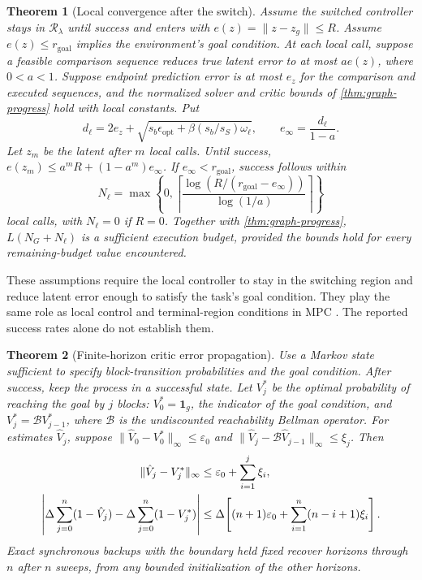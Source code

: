\documentclass{article} %
\newcommand{\ind}{\mathbf{1}}
\newcommand{\Rset}{\mathcal R_\lambda}
\newtheorem{theorem}{Theorem}
\theoremstyle{definition}
\theoremstyle{remark}
\begin{document}
\begin{theorem}[Local convergence after the switch]
\label{thm:local}
Assume the switched controller stays in $\Rset$ until success and enters with
$e(z)=\|z-z_g\|\le R$. Assume $e(z)\le r_{\mathrm{goal}}$ implies the environment's
goal condition. At each local call, suppose a feasible comparison sequence reduces true
latent error to at most $a e(z)$, where $0<a<1$.
Suppose endpoint prediction error is at most $e_z$ for the comparison and executed
sequences, and the normalized solver and critic bounds of \cref{thm:graph-progress}
hold with local constants. Put
\begin{equation}
 d_\ell=2e_z+
 \sqrt{s_b\epsilon_{\mathrm{opt}}+\beta(s_b/s_S)\omega_\ell},
 \qquad e_\infty=\frac{d_\ell}{1-a}.
 \label{eq:local-floor}
\end{equation}
Let $z_m$ be the latent after $m$ local calls. Until success, $e(z_m)\le a^mR+(1-a^m)e_\infty$.
If $e_\infty<r_{\mathrm{goal}}$, success follows within
\[
 N_\ell=\max\!\left\{0,\left\lceil
 \frac{\log(R/(r_{\mathrm{goal}}-e_\infty))}{\log(1/a)}
 \right\rceil\right\}
\]
local calls, with $N_\ell=0$ if $R=0$.
Together with \cref{thm:graph-progress}, $L(N_G+N_\ell)$ is a sufficient execution budget,
provided the bounds hold for every remaining-budget value encountered.
\end{theorem}

These assumptions require the local controller to stay in the switching region and
reduce latent error enough to satisfy the task's goal condition. They play the same role
as local control and terminal-region conditions in MPC \citep{mayne2000}.
The reported success rates alone do not establish them.

\begin{theorem}[Finite-horizon critic error propagation]
\label{thm:critic}
Use a Markov state sufficient to specify block-transition probabilities and the goal condition. After success,
keep the process in a successful state. Let $V_j^*$ be the optimal probability of reaching the goal by $j$
blocks: $V_0^*=\ind_g$, the indicator of the goal condition, and $V_j^*=\mathcal B V_{j-1}^*$, where $\mathcal B$ is the
undiscounted reachability Bellman operator.
For estimates $\hat V_j$, suppose
$\|\hat V_0-V_0^*\|_\infty\le\varepsilon_0$ and
$\|\hat V_j-\mathcal B\hat V_{j-1}\|_\infty\le\xi_j$.
Then
\begin{align}
 \|\hat V_j-V_j^*\|_\infty
 &\le\varepsilon_0+\sum_{i=1}^j\xi_i, \notag\\
 \left|\Delta\sum_{j=0}^n(1-\hat V_j)
       -\Delta\sum_{j=0}^n(1-V_j^*)\right|
 &\le\Delta\!\left[(n+1)\varepsilon_0+
                      \sum_{i=1}^n(n-i+1)\xi_i\right].
 \label{eq:critic-bound}
\end{align}
Exact synchronous backups with the boundary held fixed recover horizons through $n$
after $n$ sweeps, from any bounded initialization of the other horizons.
\end{theorem}
\end{document}
